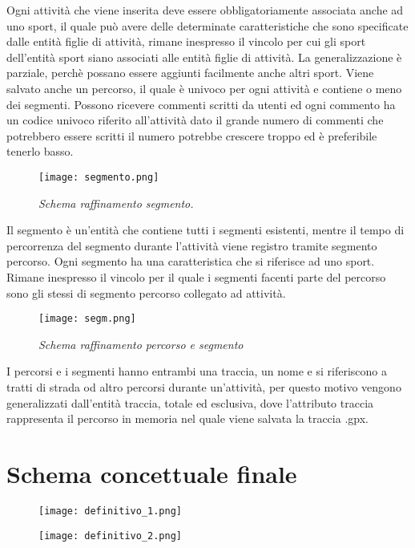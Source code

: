 \documentclass[12pt]{report}
\begin{document}
Ogni attività che viene inserita deve essere obbligatoriamente associata anche ad uno sport, 
il quale può avere delle determinate caratteristiche che sono specificate dalle entità figlie di 
attività, rimane inespresso il vincolo per cui gli sport dell'entità sport siano associati 
alle entità figlie di attività. La generalizzazione è parziale, perchè possano essere aggiunti
facilmente anche altri sport. Viene salvato anche un percorso, il quale è univoco per ogni attività
e contiene o meno dei segmenti. Possono ricevere commenti scritti da utenti ed ogni commento ha un codice
univoco riferito all'attività dato il grande numero di commenti che potrebbero essere scritti
il numero potrebbe crescere troppo ed è preferibile tenerlo basso.

\begin{figure}[H]
    \texttt{[image: segmento.png]}
    \centering
    \caption{\emph{Schema raffinamento segmento.}}
    \label{img:schema_segmento}
\end{figure}

Il segmento è un'entità che contiene tutti i segmenti esistenti, mentre il tempo di percorrenza
del segmento durante l'attività viene registro tramite segmento percorso. 
Ogni segmento ha una caratteristica che si riferisce ad uno sport.
Rimane inespresso il vincolo per il quale i segmenti facenti parte del percorso sono gli stessi
di segmento percorso collegato ad attività.

\begin{figure}[H]
    \texttt{[image: segm.png]}
    \centering
    \caption{\emph{Schema raffinamento percorso e segmento}}
    \label{img:schema_perc_seg}
\end{figure}

I percorsi e i segmenti hanno entrambi una traccia, un nome e si riferiscono a tratti di strada od altro percorsi
durante un'attività, per questo motivo vengono generalizzati dall'entità traccia, totale ed esclusiva,
dove l'attributo traccia rappresenta il percorso in memoria nel quale viene salvata la traccia .gpx.


\section{Schema concettuale finale}

    \begin{figure}[p]
        \centering
        \texttt{[image: definitivo\_1.png]}
        
    \end{figure}
    
    \begin{figure}[p]
        \centering
        \texttt{[image: definitivo\_2.png]}
    \end{figure}
    
\restoregeometry
\end{document}
